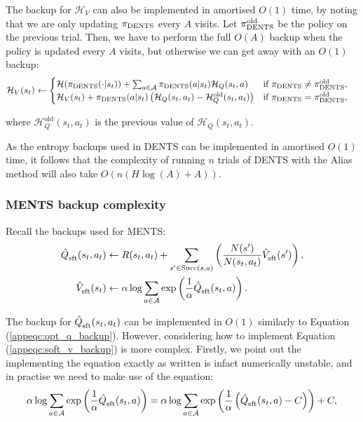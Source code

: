 \documentclass{article}
\newcommand{\cl}[1]{\mathcal{#1}}
\newcommand{\Vst}[2]{\hat{V}^{#2}_{\textnormal{sft}}(#1)}
\newcommand{\Qst}[3]{\hat{Q}^{#3}_{\textnormal{sft}}(#1,#2)}
\newcommand{\succc}[2]{\textnormal{Succ}(#1,#2)}
\theoremstyle{plain}
\begin{document}
\begin{appendices}
	        The backup for $\cl{H}_V$ can also be implemented in amortised $O(1)$ time, by noting that we are only updating $\pi_{\textnormal{DENTS}}$ every $A$ visits. Let $\pi^{\text{old}}_{\textnormal{DENTS}}$ be the policy on the previous trial. Then, we have to perform the full $O(A)$ backup when the policy is updated every $A$ visits, but otherwise we can get away with an $O(1)$ backup:
	        \begin{align}
	        \cl{H}_V(s_t) &\leftarrow
	        		\begin{cases}
	        			\cl{H}(\pi_{\textnormal{DENTS}}(\cdot | s_t)) + \sum_{a\in\cl{A}} \pi_{\textnormal{DENTS}}(a|s_t)\cl{H}_Q(s_t,a) & \text{if } \pi_{\textnormal{DENTS}}\neq \pi^{\text{old}}_{\textnormal{DENTS}}, \\
	        			\cl{H}_V(s_t) + \pi_{\textnormal{DENTS}}(a|s_t) \left( \cl{H}_Q(s_t,a_t) - \cl{H}^{\text{old}}_Q(s_t,a_t)\right) & \text{if } \pi_{\textnormal{DENTS}}= \pi^{\text{old}}_{\textnormal{DENTS}},
	        		\end{cases}
	        \end{align}
	    		
	    		where $\cl{H}^{\text{old}}_Q(s_t,a_t)$ is the previous value of $\cl{H}_Q(s_t,a_t)$.
	    		
	    		As the entropy backups used in DENTS can be implemented in amortised $O(1)$ time, it follows that the complexity of running $n$ trials of DENTS with the Alias method will also take $O(n(H\log(A)+A))$.
%	    	
	    	\subsubsection{MENTS backup complexity}
	    		
	    		Recall the backups used for MENTS:
            \begin{align}
                \Qst{s_t}{a_t}{} &\leftarrow R(s_t,a_t) + \sum_{s'\in\succc{s}{a}} \left( \frac{N(s')}{N(s_t,a_t)} \Vst{s'}{} \right), \label{appeqc:soft_q_backup} \\
                \Vst{s_t}{} &\leftarrow \alpha \log \sum_{a\in\cl{A}} \exp \left(\frac{1}{\alpha}\Qst{s_t}{a}{} \right). \label{appeqc:soft_v_backup}
            \end{align}
            
            The backup for $\Qst{s_t}{a_t}{}$ can be implemented in $O(1)$ similarly to Equation (\ref{appeqc:opt_q_backup}). However, considering how to implement Equation (\ref{appeqc:soft_v_backup}) is more complex. Firstly, we point out the implementing the equation exactly as written is infact numerically unstable, and in practise we need to make use of the equation:
            \begin{align}
            		\alpha \log \sum_{a\in\cl{A}} \exp \left(\frac{1}{\alpha}\Qst{s_t}{a}{} \right)
            			= \alpha \log \sum_{a\in\cl{A}} \exp \left(\frac{1}{\alpha}\left(\Qst{s_t}{a}{} - C \right)\right) + C,
            \end{align}
            

\end{appendices}
\end{document}
